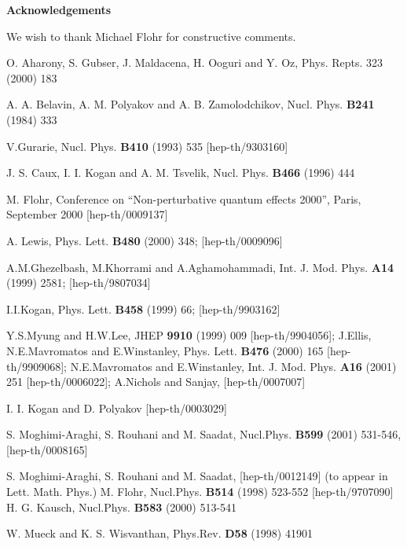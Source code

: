 \documentclass[a4paper,11pt]{article}
\begin{document}
{\bf \Large Acknowledgements}

We wish to thank Michael Flohr for constructive comments.

\begin{thebibliography}{99}
  O. Aharony, S. Gubser, J. Maldacena, H. Ooguri and Y. Oz,
Phys. Repts. 323 (2000) 183

  A. A. Belavin, A. M. Polyakov and A. B. Zamolodchikov, Nucl.
Phys. \textbf{B241} (1984) 333

  V.Gurarie, Nucl. Phys. \textbf{B410} (1993) 535
[hep-th/9303160]

  J. S. Caux, I. I. Kogan and A. M. Tsvelik,
Nucl. Phys. \textbf{B466} (1996) 444

  M. Flohr, Conference on ``Non-perturbative quantum effects 2000'', Paris, September 2000
[hep-th/0009137]

  A. Lewis,
 Phys. Lett. \textbf{B480} (2000) 348;
    [hep-th/0009096]

 A.M.Ghezelbash, M.Khorrami and A.Aghamohammadi,
    Int. J. Mod. Phys. \textbf{A14} (1999) 2581;  [hep-th/9807034]

  I.I.Kogan,
    Phys. Lett. \textbf{B458} (1999) 66;  [hep-th/9903162]

 Y.S.Myung and H.W.Lee,
    JHEP \textbf{9910} (1999) 009   [hep-th/9904056];
J.Ellis, N.E.Mavromatos and E.Winstanley,
    Phys. Lett. \textbf{B476} (2000) 165 [hep-th/9909068];
N.E.Mavromatos and E.Winstanley,
    Int. J. Mod. Phys. \textbf{A16} (2001) 251  [hep-th/0006022];
A.Nichols and Sanjay,
   [hep-th/0007007]

  I. I. Kogan and D. Polyakov [hep-th/0003029]

 S. Moghimi-Araghi, S. Rouhani and M. Saadat, Nucl.Phys.
\textbf{B599} (2001) 531-546, [hep-th/0008165]

  S. Moghimi-Araghi, S. Rouhani and M. Saadat,
[hep-th/0012149] (to appear in Lett. Math. Phys.)
  M. Flohr, Nucl.Phys. \textbf{B514} (1998) 523-552 [hep-th/9707090]
  H. G. Kausch, Nucl.Phys. \textbf{B583} (2000) 513-541

 W. Mueck and K. S. Wisvanthan, Phys.Rev. \textbf{D58} (1998) 41901




\end{thebibliography}
\end{document}
